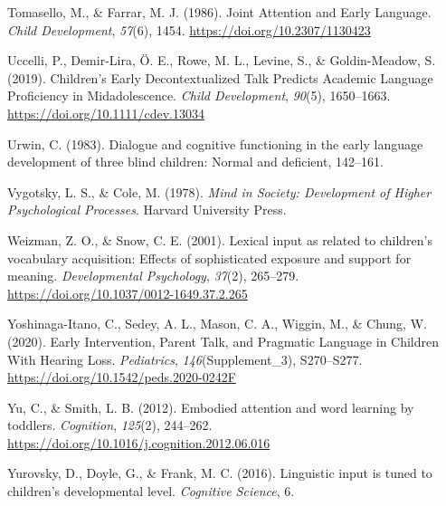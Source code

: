 \documentclass[english,man]{apa6}
\begin{document}
\leavevmode\hypertarget{ref-tomasello1986}{}%
Tomasello, M., \& Farrar, M. J. (1986). Joint Attention and Early Language. \emph{Child Development}, \emph{57}(6), 1454. \url{https://doi.org/10.2307/1130423}

\leavevmode\hypertarget{ref-uccelli2019}{}%
Uccelli, P., Demir-Lira, Ö. E., Rowe, M. L., Levine, S., \& Goldin-Meadow, S. (2019). Children's Early Decontextualized Talk Predicts Academic Language Proficiency in Midadolescence. \emph{Child Development}, \emph{90}(5), 1650--1663. \url{https://doi.org/10.1111/cdev.13034}

\leavevmode\hypertarget{ref-urwin1983}{}%
Urwin, C. (1983). Dialogue and cognitive functioning in the early language development of three blind children: Normal and deficient, 142--161.

\leavevmode\hypertarget{ref-vygotsky1978}{}%
Vygotsky, L. S., \& Cole, M. (1978). \emph{Mind in Society: Development of Higher Psychological Processes}. Harvard University Press.

\leavevmode\hypertarget{ref-weizman2001}{}%
Weizman, Z. O., \& Snow, C. E. (2001). Lexical input as related to children's vocabulary acquisition: Effects of sophisticated exposure and support for meaning. \emph{Developmental Psychology}, \emph{37}(2), 265--279. \url{https://doi.org/10.1037/0012-1649.37.2.265}

\leavevmode\hypertarget{ref-yoshinaga-itano2020}{}%
Yoshinaga-Itano, C., Sedey, A. L., Mason, C. A., Wiggin, M., \& Chung, W. (2020). Early Intervention, Parent Talk, and Pragmatic Language in Children With Hearing Loss. \emph{Pediatrics}, \emph{146}(Supplement\_3), S270--S277. \url{https://doi.org/10.1542/peds.2020-0242F}

\leavevmode\hypertarget{ref-yu2012}{}%
Yu, C., \& Smith, L. B. (2012). Embodied attention and word learning by toddlers. \emph{Cognition}, \emph{125}(2), 244--262. \url{https://doi.org/10.1016/j.cognition.2012.06.016}

\leavevmode\hypertarget{ref-yurovsky2016}{}%
Yurovsky, D., Doyle, G., \& Frank, M. C. (2016). Linguistic input is tuned to children's developmental level. \emph{Cognitive Science}, 6.
\end{document}
